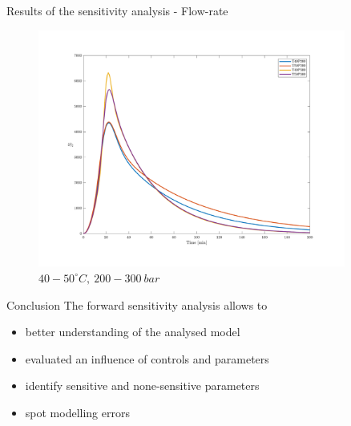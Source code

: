 \documentclass[8pt]{beamer}
\begin{document}
	\begin{frame}[fragile]{Results of the sensitivity analysis - Flow-rate}
		\begin{figure}[h]
			\centering
			\includegraphics[trim = 2cm 2cm 2cm 2cm,clip,width=0.9\textwidth,center]{Figures/F_all.pdf}	
			\caption{$40-50^\circ C,~200-300~bar$}
		\end{figure}
	\end{frame}


	\begin{frame}[fragile]{Conclusion}
		The forward sensitivity analysis allows to 
		\begin{itemize}
			\item better understanding of the analysed model
			\item evaluated an influence of controls and parameters 
			\item identify sensitive and none-sensitive parameters
			\item spot modelling errors 
		\end{itemize}
		
	\end{frame}

		
\end{document}
